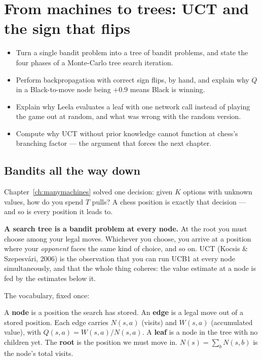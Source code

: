 \chapter{From machines to trees: UCT and the sign that flips}
\label{ch:uct}

\begin{objectives}
\begin{itemize}
\item Turn a single bandit problem into a tree of bandit problems, and state the four phases
  of a Monte-Carlo tree search iteration.
\item Perform backpropagation with correct sign flips, by hand, and explain why $Q$ in a
  Black-to-move node being $+0.9$ means Black is winning.
\item Explain why Leela evaluates a leaf with one network call instead of playing the game
  out at random, and what was wrong with the random version.
\item Compute why UCT without prior knowledge cannot function at chess's branching factor
  --- the argument that forces the next chapter.
\end{itemize}
\end{objectives}

\section{Bandits all the way down}

Chapter~\ref{ch:manymachines} solved one decision: given $K$ options with unknown values,
how do you spend $T$ pulls? A chess position is exactly that decision --- and so is every
position it leads to.

\begin{keyidea}
\textbf{A search tree is a bandit problem at every node.} At the root you must choose among
your legal moves. Whichever you choose, you arrive at a position where your \emph{opponent}
faces the same kind of choice, and so on. UCT (Kocsis \& Szepesv\'ari, 2006) is the
observation that you can run UCB1 at every node simultaneously, and that the whole thing
coheres: the value estimate at a node is fed by the estimates below it.
\end{keyidea}

The vocabulary, fixed once:

\begin{notationbox}
A \textbf{node} is a position the search has stored. An \textbf{edge} is a legal move out of
a stored position. Each edge carries $N(s,a)$ (visits) and $W(s,a)$ (accumulated value), with
$Q(s,a) = W(s,a)/N(s,a)$. A \textbf{leaf} is a node in the tree with no children yet. The
\textbf{root} is the position we must move in. $N(s) = \sum_b N(s,b)$ is the node's total
visits.
\end{notationbox}

